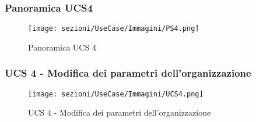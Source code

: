 \subsubsection{Panoramica UCS4}

\begin{figure}[h]
	\centering	
	\texttt{[image: sezioni/UseCase/Immagini/PS4.png]}
	\caption{Panoramica UCS 4}
\end{figure}

\subsubsection{UCS 4 - Modifica dei parametri dell'organizzazione}%

\begin{figure}[h]
	\centering	
	\texttt{[image: sezioni/UseCase/Immagini/UCS4.png]}
	\caption{UCS 4 - Modifica dei parametri dell'organizzazione}
\end{figure}

